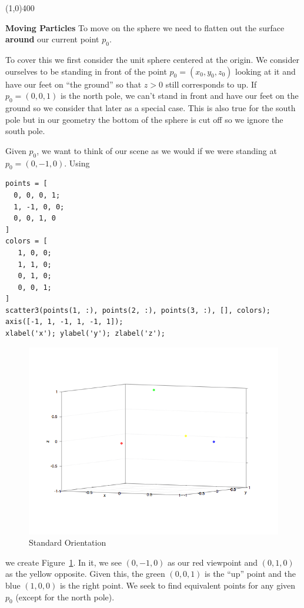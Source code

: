 \documentclass[a4paper,10pt]{article}
\begin{document}
\begin{center}
\line(1,0){400}
\end{center}

\textbf{Moving Particles} To move on the sphere we need to flatten out the
surface \textbf{around} our current point \(p_0\).

To cover this we first consider the unit sphere centered at the origin.
We consider ourselves to be standing in front of the point \(p_0 = (x_0,
y_0, z_0)\) looking at it and have our feet on ``the ground'' so that
\(z > 0\) still corresponds to up. If \(p_0 = (0, 0, 1)\) is the north pole,
we can't stand in front and have our feet on the ground so we consider that
later as a special case. This is also true for the south pole but in our
geometry the bottom of the sphere is cut off so we ignore the south pole.

Given \(p_0\), we want to think of our scene as we would if we were
standing at \(p_0 = (0, -1, 0)\). Using
\begin{verbatim}
points = [
  0, 0, 0, 1;
  1, -1, 0, 0;
  0, 0, 1, 0
]
colors = [
   1, 0, 0;
   1, 1, 0;
   0, 1, 0;
   0, 0, 1;
]
scatter3(points(1, :), points(2, :), points(3, :), [], colors);
axis([-1, 1, -1, 1, -1, 1]);
xlabel('x'); ylabel('y'); zlabel('z');
\end{verbatim}
\begin{figure}
  \centering
    \includegraphics[scale=0.5]{standard_orientation.png}
  \caption{Standard Orientation}
  \label{fig:1f}
\end{figure}
we create Figure~\ref{fig:1f}. In it, we see \((0, -1, 0)\) as our red
viewpoint and \((0, 1, 0)\) as the yellow opposite. Given this, the green
\((0, 0, 1)\) is the ``up'' point and the blue \((1, 0, 0)\) is the right
point. We seek to find equivalent points for any given \(p_0\) (except for
the north pole).
\end{document}
